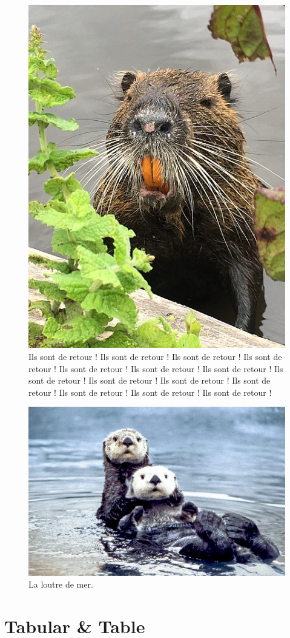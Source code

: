 \documentclass[a4paper, twoside, onecolumn, 10pt]{article}
\begin{document}
\begin{figure}[tb!]
\begin{center}
\includegraphics[width = .4\textwidth]{images/ragondin.jpg}
\end{center}
\caption{Ils sont de retour !  Ils sont de retour ! Ils sont de retour ! Ils sont de retour ! Ils sont de retour ! Ils sont de retour ! Ils sont de retour ! Ils sont de retour ! Ils sont de retour ! Ils sont de retour ! Ils sont de retour ! Ils sont de retour ! Ils sont de retour ! Ils sont de retour ! }
\label{fig:ragondin2}
\end{figure}

\begin{figure}[h]
\begin{center}
\includegraphics[width = .9\textwidth]{images/loutre.jpg}
\end{center}
\caption{La loutre de mer. }
\label{fig:loutre}
\end{figure}


\blindtext[20]

\section{Tabular \& Table}
\end{document}
